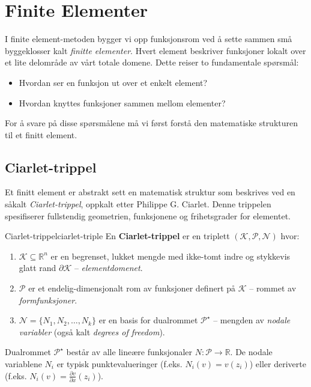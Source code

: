 \documentclass[../../main.tex]{subfiles}
\begin{document}
\section{Finite Elementer}

I finite element-metoden bygger vi opp funksjonsrom ved å sette sammen små byggeklosser kalt \emph{finitte elementer}. Hvert element beskriver funksjoner lokalt over et lite delområde av vårt totale domene. Dette reiser to fundamentale spørsmål:
\begin{itemize}
    \item Hvordan ser en funksjon ut over et enkelt element?
    \item Hvordan knyttes funksjoner sammen mellom elementer?
\end{itemize}

For å svare på disse spørsmålene må vi først forstå den matematiske strukturen til et finitt element.

\subsection{Ciarlet-trippel}

Et finitt element er abstrakt sett en matematisk struktur som beskrives ved en såkalt \emph{Ciarlet-trippel}, oppkalt etter Philippe G. Ciarlet. Denne trippelen spesifiserer fullstendig geometrien, funksjonene og frihetsgrader for elementet.

\begin{definition}{Ciarlet-trippel}{ciarlet-triple}
En \textbf{Ciarlet-trippel} er en triplett $(\mathcal{K}, \mathcal{P}, \mathcal{N})$ hvor:
\begin{enumerate}
    \item $\mathcal{K} \subseteq \mathbb{R}^n$ er en begrenset, lukket mengde med ikke-tomt indre og stykkevis glatt rand $\partial \mathcal{K}$ -- \emph{elementdomenet}.
    \item $\mathcal{P}$ er et endelig-dimensjonalt rom av funksjoner definert på $\mathcal{K}$ -- rommet av \emph{formfunksjoner}.
    \item $\mathcal{N} = \{N_1, N_2, \ldots, N_k\}$ er en basis for dualrommet $\mathcal{P}^\star$ -- mengden av \emph{nodale variabler} (også kalt \emph{degrees of freedom}).
\end{enumerate}
\end{definition}

\begin{remark}{}{}
Dualrommet $\mathcal{P}^\star$ består av alle lineære funksjonaler $N: \mathcal{P} \to \mathbb{R}$. De nodale variablene $N_i$ er typisk punktevalueringer (f.eks. $N_i(v) = v(z_i)$) eller deriverte (f.eks. $N_i(v) = \frac{\partial v}{\partial x}(z_i)$).
\end{remark}
\end{document}
